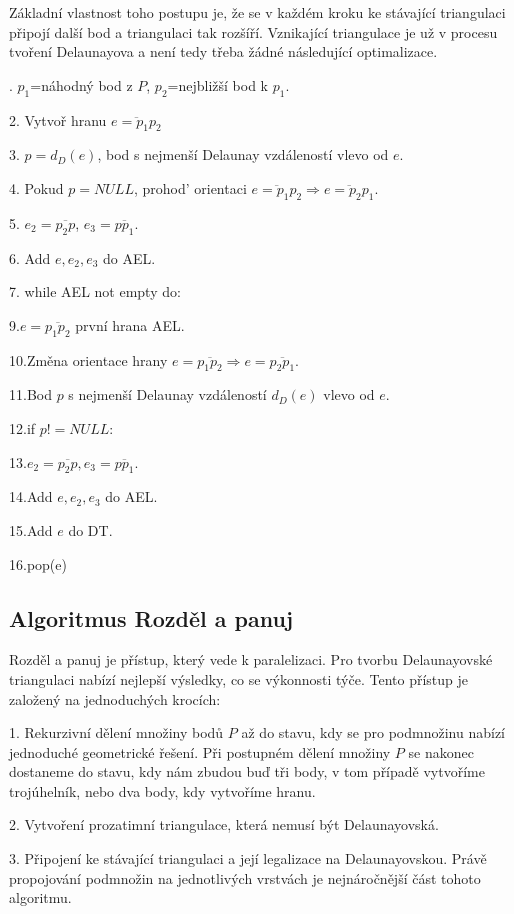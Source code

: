 \documentclass[12pt,a4paper]{article}
\begin{document}
Základní vlastnost toho postupu je, že se v každém kroku ke stávající triangulaci připojí další bod a triangulaci tak rozšíří. Vznikající triangulace je už v procesu tvoření Delaunayova a není tedy třeba žádné následující optimalizace.

. $p_1$=náhodný bod z $P$, $p_2$=nejbližší bod k $p_1$.

2. Vytvoř hranu $\overline{e=p_1p_2}$

3. $p=d_D(e)$, bod s nejmenší Delaunay vzdáleností vlevo od $e$.

4. Pokud $p=NULL$, prohod’ orientaci $\overline{e=p_1p_2} \Rightarrow \overline{e=p_2p_1}$.

5. $e_2=\overline{p_2p}$, $e_3=\overline{pp_1}$.

6. Add $e, e_2, e_3$ do AEL.

7. while AEL not empty do:

9.\indent  $e=\overline{p_1p_2}$ první hrana AEL.

10.\indent  Změna orientace hrany $e=\overline{p_1p_2} \Rightarrow e=\overline{p_2p_1}$.

11.\indent  Bod $p$ s nejmenší Delaunay vzdáleností $d_D(e)$ vlevo od $e$.

12.\indent  if $p! =NULL:$

13.\indent \indent $e_2=\overline{p_2p}, e_3=\overline{pp_1}$.

14.\indent \indent Add $e, e_2, e_3$ do AEL.

15.\indent \indent Add $e$ do DT.

16.\indent pop(e)

\newpage
\subsection{Algoritmus Rozděl a panuj}

Rozděl a panuj je přístup, který vede k paralelizaci. Pro tvorbu Delaunayovské triangulaci nabízí nejlepší výsledky, co se výkonnosti týče. Tento přístup je založený na jednoduchých krocích:

1. Rekurzivní dělení množiny bodů $P$ až do stavu, kdy se pro podmnožinu nabízí jednoduché geometrické řešení. Při postupném dělení množiny $P$ se nakonec dostaneme do stavu, kdy nám zbudou buď tři body, v tom případě vytvoříme trojúhelník, nebo dva body, kdy vytvoříme hranu.

2. Vytvoření prozatimní triangulace, která nemusí být Delaunayovská.

3. Připojení ke stávající triangulaci a její legalizace na Delaunayovskou. Právě propojování podmnožin na jednotlivých vrstvách je nejnáročnější část tohoto algoritmu.
\end{document}

